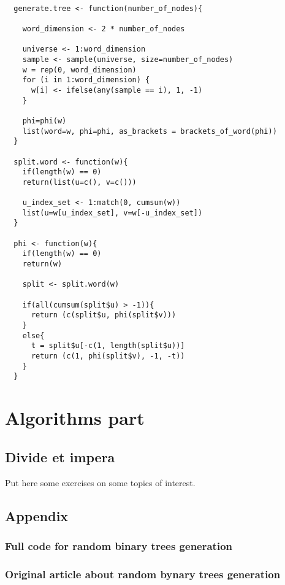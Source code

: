 \documentclass[twoside,openright,titlepage,fleqn,
	headinclude,11pt,a4paper,BCOR5mm,footinclude
	]{scrbook}
\begin{document}
\begin{lstlisting}

  generate.tree <- function(number_of_nodes){

    word_dimension <- 2 * number_of_nodes
    
    universe <- 1:word_dimension
    sample <- sample(universe, size=number_of_nodes)
    w = rep(0, word_dimension)
    for (i in 1:word_dimension) {
      w[i] <- ifelse(any(sample == i), 1, -1)
    }
    
    phi=phi(w)
    list(word=w, phi=phi, as_brackets = brackets_of_word(phi))
  }

  split.word <- function(w){
    if(length(w) == 0)
    return(list(u=c(), v=c()))
    
    u_index_set <- 1:match(0, cumsum(w))
    list(u=w[u_index_set], v=w[-u_index_set])
  }

  phi <- function(w){
    if(length(w) == 0)
    return(w)
    
    split <- split.word(w) 
    
    if(all(cumsum(split$u) > -1)){
      return (c(split$u, phi(split$v)))
    }
    else{
      t = split$u[-c(1, length(split$u))]
      return (c(1, phi(split$v), -1, -t))
    }
  }
\end{lstlisting}

\part{Algorithms part}

\chapter{Divide et impera}
Put here some exercises on some topics of interest.

\chapter{Appendix}

\section{Full code for random binary trees generation}


\section{Original article about random bynary trees generation}


\end{document}
